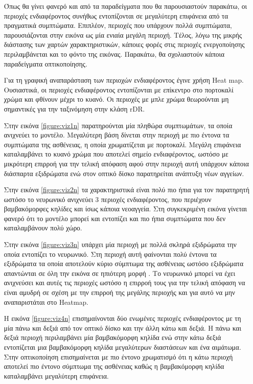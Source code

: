 Όπως θα γίνει φανερό και από τα παραδείγματα που θα παρουσιαστούν παρακάτω, οι περιοχές ενδιαφέροντος συνήθως εντοπίζονται σε μεγαλύτερη επιφάνεια από τα πραγματικά συμπτώματα. Επιπλέον, περιοχές που υπάρχουν πολλά συμπτώματα, παρουσιάζονται στην εικόνα ως μία ενιαία μεγάλη περιοχή. Τέλος, λόγω  της μικρής διάστασης των χαρτών χαρακτηριστικών, κάποιες φορές στις περιοχές ενεργοποίησης περιλαμβάνεται και το φόντο της εικόνας. Παρακάτω, θα σχολιαστούν κάποια παραδείγματα οπτικοποίησης.

Για τη γραφική αναπαράσταση των περιοχών ενδιαφέροντος έγινε χρήση Heat map. Ουσιαστικά, οι περιοχές ενδιαφέροντος εντοπίζονται με επίκεντρο στο πορτοκαλί χρώμα και φθίνουν μέχρι το κυανό. Οι περιοχές με μπλε χρώμα θεωρούνται μη σημαντικές για την ταξινόμηση στην κλάση rDR.

Στην εικόνα \ref{figure:viz1n} παρατηρούνται μία πληθώρα συμπτωμάτων, τα οποία ανιχνεύει το μοντέλο. Μεγαλύτερη βάση δίνεται στην περιοχή με πιο έντονα τα συμπτώματα της ασθένειας, η οποία χρωματίζεται με πορτοκαλί. Μεγάλη επιφάνεια καταλαμβάνει το κυανό χρώμα που αποτελεί σημείο ενδιαφέροντος, ωστόσο με μικρότερη  επιρροή για την τελική απόφαση αφού στην περιοχή αυτή υπάρχουν κάποια διάσπαρτα εξιδρώματα ενώ στον οπτικό δίσκο παρατηρείται ανάπτυξη νέων αγγείων.

Στην εικόνα \ref{figure:viz2n} τα χαρακτηριστικά είναι πολύ πιο ήπια για τον παρατηρητή ωστόσο το νευρωνικό ανιχνεύει 3 περιοχές ενδιαφέροντος, που περιέχουν βαμβακόμορφες κηλίδες και ίσως κάποια νεοαγγεία. Στη συγκεκριμένη εικόνα γίνεται φανερό ότι το μοντέλο μπορεί και εντοπίζει και πιο ήπια συμπτώματα που δεν καταλαμβάνουν πολύ χώρο.

Στην εικόνα \ref{figure:viz3n} υπάρχει μία περιοχή με πολλά σκληρά εξιδρώματα την οποία εντοπίζει το νευρωνικό. Στη περιοχή αυτή φαίνονται πολύ έντονα τα εξιδρώματα τα οποία αποτελούν κύριο σύμπτωμα της ασθένειας ωστόσο εξιδρώματα απαντώνται σε όλη την εικόνα σε ηπιότερη μορφή . Το νευρωνικό μπορεί να έχει ανιχνεύσει και αυτές τις περιοχές ωστόσο η επιρροή τους για την τελική απόφαση να είναι αμυδρή σε σχέση με την επιρροή της μεγάλης περιοχής και για αυτό να μην αναπαριστάται στο Heatmap. 

Η εικόνα \ref{figure:viz4n} επισημαίνονται δύο ενωμένες περιοχές ενδιαφέροντος με τη μία πάνω και δεξιά από τον οπτικό δίσκο και την άλλη κάτω και δεξιά. Η πάνω και δεξιά περιοχή περιλαμβάνει μία  βαμβακόμορφη κηλίδα ενώ στην κάτω δεξιά εντοπίζεται μια  βαμβακόμορφη κηλίδα μεγαλύτερων διαστάσεων και ένα αιμάτωμα. Στην οπτικοποίηση επισημαίνεται με πιο έντονο χρωματισμό ότι η κάτω περιοχή αποτελεί πιο έντονο σύμπτωμα της ασθένειας καθώς η  βαμβακόμορφη κηλίδα καταλαμβάνει μεγαλύτερη επιφάνεια.


